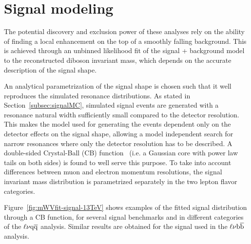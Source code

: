 \section{Signal modeling}\label{sec:signalModel}

The potential discovery and exclusion power of these analyses rely on the ability of finding a local enhancement on the top of a smoothly falling background. 
This is achieved through an unbinned likelihood fit of the signal + background model to the reconstructed diboson invariant mass, which depends on the accurate description of the signal shape.

An analytical parametrization of the signal shape is chosen such that it well reproduces the simulated resonance distributions.
As stated in Section~\ref{subsec:signalMC}, simulated signal events are generated with a resonance natural width sufficiently small compared to the detector resolution.
This makes the model used for generating the events dependent only on the detector effects on the signal shape, allowing a model independent search for narrow resonances
where only the detector resolution has to be described. A double-sided Crystal-Ball (CB) function~\cite{CrystalBallRef} (i.e. a Gaussian core with power law tails on both sides) is found to well serve this purpose.
To take into account differences between muon and electron momentum resolutions, the signal invariant mass distribution is parametrized separately in the two lepton flavor categories.

Figure~\ref{fig:mWVfit-signal-13TeV} shows examples of the fitted signal distribution through a CB function, for several signal benchmarks and in different \mJ categories of the $\ell\nu\mathrm{q}\overline{\mathrm{q}}$ analysis.
Similar results are obtained for the \Wpr signal used in the $\ell\nu{\mathrm{b}\overline{\mathrm{b}}}$ analysis.


